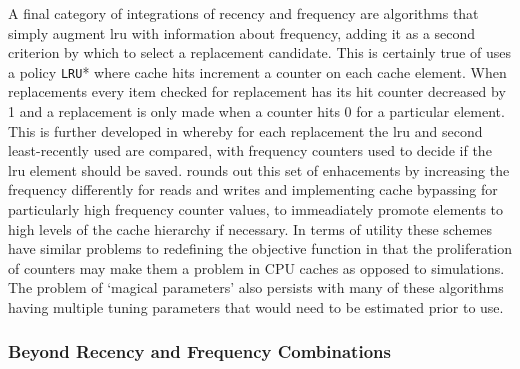 A final category of integrations of recency and frequency are algorithms that simply augment \gls{lru} with information about frequency, adding it as a second criterion by which to select a replacement candidate. This is certainly true of \citet{changLRUWWWProxy1999} uses a policy \texttt{LRU}* where cache hits increment a counter on each cache element. When replacements every item checked for replacement has its hit counter decreased by 1 and a replacement is only made when a counter hits 0 for a particular element.  This is further developed in \citet{alghazoSFLRUCacheReplacement2004} whereby for each replacement the \gls{lru} and second least-recently used are compared, with frequency counters used to decide if the \gls{lru} element should be saved. \citet{dybdahlLRUbasedReplacementAlgorithm2006} rounds out this set of enhacements by increasing the frequency differently for reads and writes and implementing cache bypassing for particularly high frequency counter values, to immeadiately promote elements to high levels of the cache hierarchy if necessary. In terms of utility these schemes have similar problems to redefining the objective function in that the proliferation of counters may make them a problem in CPU caches as opposed to simulations. The problem of `magical parameters' also persists with many of these algorithms having multiple tuning parameters that would need to be estimated prior to use.


\subsubsection{Beyond Recency and Frequency Combinations}

